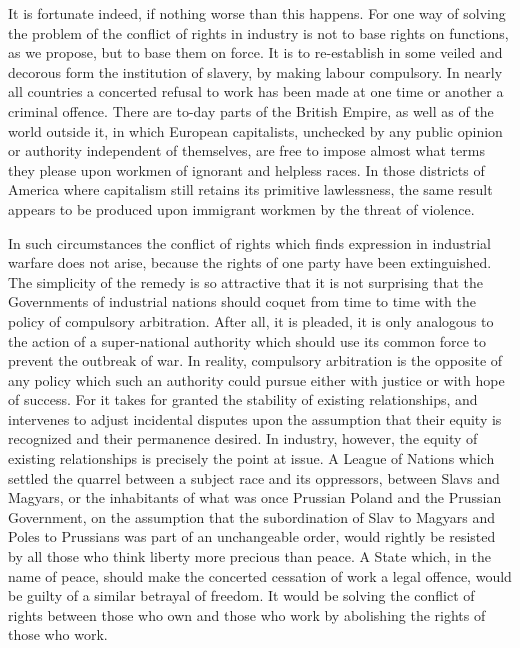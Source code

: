 \documentclass{book}
\begin{document}
It is fortunate indeed, if nothing worse than this happens. For one way of solving the problem of the conflict of rights in industry is not to base rights on functions, as we propose, but to base them on force. It is to re-establish in some veiled and decorous form the institution of slavery, by making labour compulsory. In nearly all countries a concerted refusal to work has been made at one time or another a criminal offence. There are to-day parts of the British Empire, as well as of the world outside it, in which European capitalists, unchecked by any public opinion or authority independent of themselves, are free to impose almost what terms they please upon workmen of ignorant and helpless races. In those districts of America where capitalism still retains its primitive lawlessness, the same result appears to be produced upon immigrant workmen by the threat of violence.

In such circumstances the conflict of rights which finds expression in industrial warfare does not arise, because the rights of one party have been extinguished. The simplicity of the remedy is so attractive that it is not surprising that the Governments of industrial nations should coquet from time to time with the policy of compulsory arbitration. After all, it is pleaded, it is only analogous to the action of a super-national authority which should use its common force to prevent the outbreak of war. In reality, compulsory arbitration is the opposite of any policy which such an authority could pursue either with justice or with hope of success. For it takes for granted the stability of existing relationships, and intervenes to adjust incidental disputes upon the assumption that their equity is recognized and their permanence desired. In industry, however, the equity of existing relationships is precisely the point at issue. A League of Nations which settled the quarrel between a subject race and its oppressors, between Slavs and Magyars, or the inhabitants of what was once Prussian Poland and the Prussian Government, on the assumption that the subordination of Slav to Magyars and Poles to Prussians was part of an unchangeable order, would rightly be resisted by all those who think liberty more precious than peace. A State which, in the name of peace, should make the concerted cessation of work a legal offence, would be guilty of a similar betrayal of freedom. It would be solving the conflict of rights between those who own and those who work by abolishing the rights of those who work.
\end{document}
